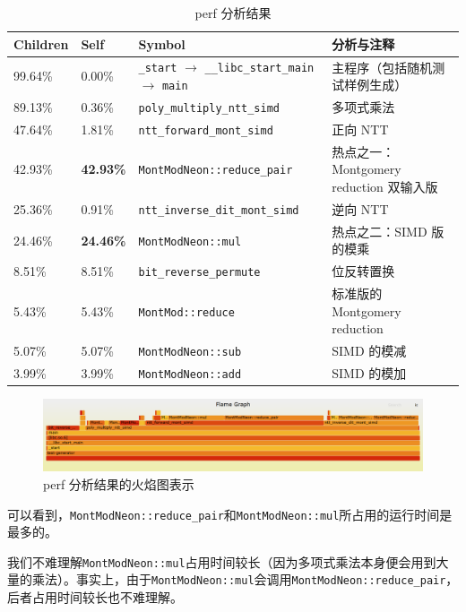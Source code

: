 \documentclass[a4paper]{article}
\begin{document}
\begin{table}[h]
\centering
\begin{tabular}{|l|l|l|l|}
\hline
Children & Self & Symbol & 分析与注释 \\ \hline
99.64\% & 0.00\% & \texttt{\_start} $\rightarrow$ \texttt{\_\_libc\_start\_main} $\rightarrow$ \texttt{main} & 主程序（包括随机测试样例生成） \\ \hline
89.13\% & 0.36\% & \texttt{poly\_multiply\_ntt\_simd} & 多项式乘法 \\ \hline
47.64\% & 1.81\% & \texttt{ntt\_forward\_mont\_simd} & 正向 NTT \\ \hline
42.93\% & \textbf{42.93\%} & \texttt{MontModNeon::reduce\_pair} & 热点之一：Montgomery reduction 双输入版 \\ \hline
25.36\% & 0.91\% & \texttt{ntt\_inverse\_dit\_mont\_simd} & 逆向 NTT \\ \hline
24.46\% & \textbf{24.46\%} & \texttt{MontModNeon::mul} & 热点之二：SIMD 版的模乘 \\ \hline
8.51\% & 8.51\% & \texttt{bit\_reverse\_permute} & 位反转置换 \\ \hline
5.43\% & 5.43\% & \texttt{MontMod::reduce} & 标准版的 Montgomery reduction \\ \hline
5.07\% & 5.07\% & \texttt{MontModNeon::sub} & SIMD 的模减 \\ \hline
3.99\% & 3.99\% & \texttt{MontModNeon::add} & SIMD 的模加 \\ \hline
\end{tabular}
\caption{perf 分析结果}
\label{t2}
\end{table}

\begin{figure}
    \centering
    \includegraphics[width=1\linewidth]{image/3.png}
    \caption{perf 分析结果的火焰图表示}
    \label{fig:enter-label}
\end{figure}

可以看到，\texttt{MontModNeon::reduce\_pair}和\texttt{MontModNeon::mul}所占用的运行时间是最多的。

我们不难理解\texttt{MontModNeon::mul}占用时间较长（因为多项式乘法本身便会用到大量的乘法）。事实上，由于\texttt{MontModNeon::mul}会调用\texttt{MontModNeon::reduce\_pair}，后者占用时间较长也不难理解。
\end{document}
